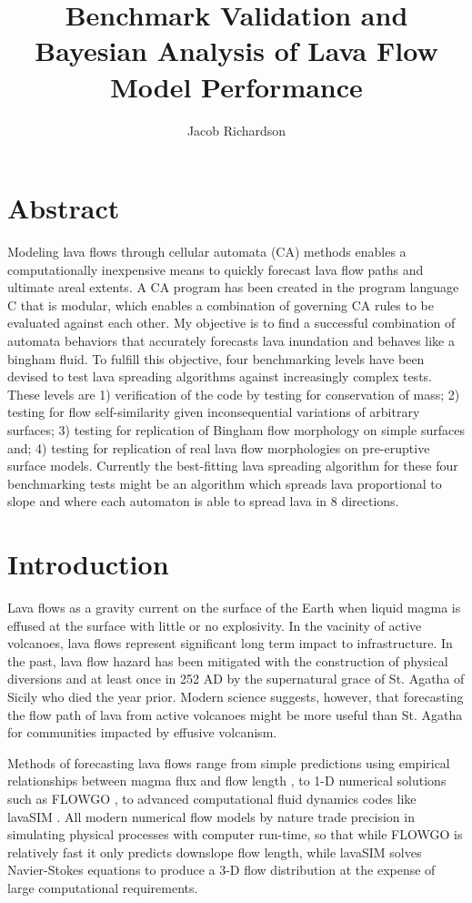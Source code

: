 \documentclass[12pt,letter]{article}
\title{Benchmark Validation and Bayesian Analysis of Lava Flow Model Performance}
\author{Jacob Richardson}
\begin{document}
\maketitle

\section*{Abstract}
	Modeling lava flows through cellular automata (CA) methods enables a computationally inexpensive means to quickly forecast lava flow paths and ultimate areal extents. A CA program has been created in the program language C that is modular, which enables a combination of governing CA rules to be evaluated against each other. My objective is to find a successful combination of automata behaviors that accurately forecasts lava inundation and behaves like a bingham fluid. To fulfill this objective, four benchmarking levels have been devised to test lava spreading algorithms against increasingly complex tests. These levels are 1) verification of the code by testing for conservation of mass; 2) testing for flow self-similarity given inconsequential variations of arbitrary surfaces; 3) testing for replication of Bingham flow morphology on simple surfaces and; 4) testing for replication of real lava flow morphologies on pre-eruptive surface models. Currently the best-fitting lava spreading algorithm for these four benchmarking tests might be an algorithm which spreads lava proportional to slope and where each automaton is able to spread lava in 8 directions.

\section{Introduction}
	Lava flows as a gravity current on the surface of the Earth when liquid magma is effused at the surface with little or no explosivity. In the vacinity of active volcanoes, lava flows represent significant long term impact to infrastructure. In the past, lava flow hazard has been mitigated with the construction of physical diversions and at least once in 252 AD by the supernatural grace of St. Agatha of Sicily who died the year prior. Modern science suggests, however, that forecasting the flow path of lava from active volcanoes might be more useful than St. Agatha for communities impacted by effusive volcanism.

	Methods of forecasting lava flows range from simple predictions using empirical relationships between magma flux and flow length \citep{Glaze2003}, to 1-D numerical solutions such as FLOWGO \citep{harris2001flowgo}, to advanced computational fluid dynamics codes like lavaSIM \citep{hidaka2005vtfs}. All modern numerical flow models by nature trade precision in simulating physical processes with computer run-time, so that while FLOWGO is relatively fast it only predicts downslope flow length, while lavaSIM solves Navier-Stokes equations to produce a 3-D flow distribution at the expense of large computational requirements.
	
\end{document}
